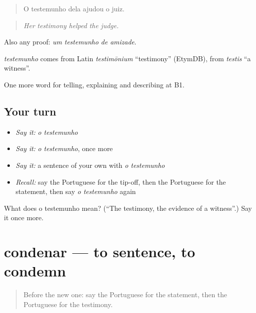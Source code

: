 \begin{quote}
O testemunho dela ajudou o juiz.
\end{quote}

\begin{quote}
\emph{Her testimony helped the judge.}
\end{quote}

Also any proof: \emph{um testemunho de amizade}.

\begin{cousinweb}
\emph{testemunho} comes from Latin \emph{testimōnium} \textquotedblleft{}testimony\textquotedblright{} (EtymDB), from \emph{testis} \textquotedblleft{}a witness\textquotedblright{}.
\end{cousinweb}

\begin{grammarlens}[title={What you've built}]
One more word for telling, explaining and describing at B1.
\end{grammarlens}

\subsection*{Your turn}
\begin{itemize}
\raggedright
  \item \emph{Say it:} \emph{o testemunho}
  \item \emph{Say it:} \emph{o testemunho}, once more
  \item \emph{Say it:} a sentence of your own with \emph{o testemunho}
  \item \emph{Recall:} say the Portuguese for the tip-off, then the Portuguese for the statement, then say \emph{o testemunho} again
\end{itemize}

\begin{tcolorbox}[breakable,colback=teal!4,colframe=teal!35!black,title={Before you move on}]
What does o testemunho mean? (\textquotedblleft{}The testimony, the evidence of a witness\textquotedblright{}.) Say it once more.
\end{tcolorbox}
\section[condenar]{condenar — to sentence, to condemn}

\label{lesson:PT-C297-condenar}



\begin{quote}
Before the new one: say the Portuguese for the statement, then the Portuguese for the testimony.
\end{quote}

